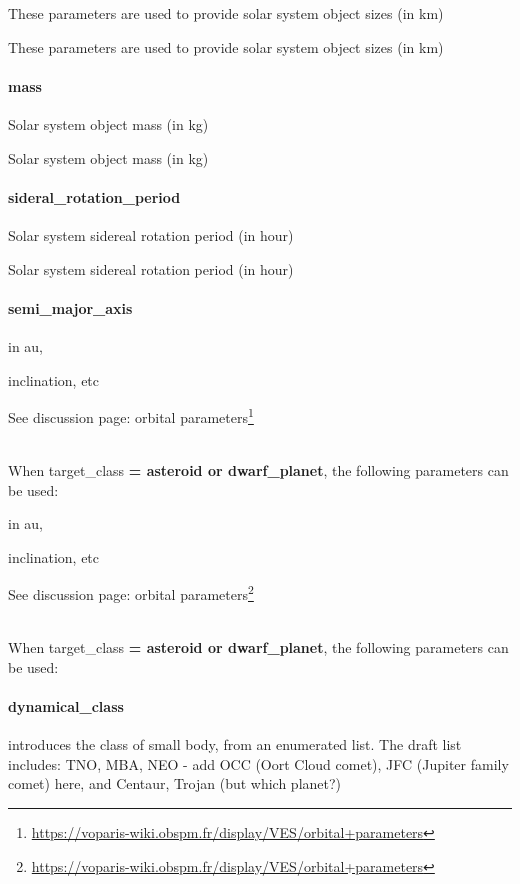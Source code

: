 \documentclass[11pt,a4paper]{ivoa}
\begin{document}
These parameters are used to provide solar system object sizes (in km)

These parameters are used to provide solar system object sizes (in km)

\paragraph{mass}

Solar system object mass (in kg)

Solar system object mass (in kg)

\paragraph{sideral\_rotation\_period}

Solar system sidereal rotation period (in hour)

Solar system sidereal rotation period (in hour)

\paragraph{semi\_major\_axis}

in au,

inclination, etc

See discussion page: orbital parameters\footnote{\url{https://voparis-wiki.obspm.fr/display/VES/orbital+parameters}}

\\

When target\_class\textbf{ = asteroid or dwarf\_planet}, the following parameters can be used:\textbf{\\}

in au,

inclination, etc

See discussion page: orbital parameters\footnote{\url{https://voparis-wiki.obspm.fr/display/VES/orbital+parameters}}

\\

When target\_class\textbf{ = asteroid or dwarf\_planet}, the following parameters can be used:\textbf{\\}

\paragraph{dynamical\_class}

introduces the class of small body, from an enumerated list. The draft list includes: TNO, MBA, NEO - add OCC (Oort Cloud comet), JFC (Jupiter family comet) here, and Centaur, Trojan (but which planet?)
\end{document}
